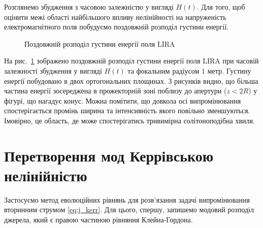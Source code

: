 
Розглянемо збудження з часовою залежністю у вигляді $ H(t) $. Для того, щоб 
оцінити межі області найбільшого впливу нелінійності на напруженість 
електромагнітного поля побудуємо поздовжній розподіл густини енергії. 

\begin{figure}
\caption{Поздовжній розподіл густини енергії поля LIRA}
\label{fig:long_dist}
\end{figure}

На рис.~\ref{fig:long_dist} зображено поздовжній розподіл густини енергії 
поля LIRA при часовій залежності збудження у вигляді $ H(t) $ та фокальним 
радіусом 1 метр. Густину енергії побудовано в двох ортогональних площинах.
З рисунків видно, що більша частина енергії зосереджена в прожекторній зоні 
поблизу до апертури ($ z < 2R $) у фігурі, що нагадує конус. Можна помітити, 
що довкола осі випромінювання спостерігається промінь ширина та інтенсивність 
якого повільно зменшуються. Імовірно, це область, де може спостерігатись 
тривимірна солітоноподібна хвиля.


\section{Перетворення мод Керрівською нелінійністю}

Застосуємо метод еволюційних рівнянь для розв'язання задачі випромінювання 
вторинним струмом \eqref{eq:j_kerr}. Для цього, спершу, запишемо модовий
розподіл джерела, який є правою частиною рівняння Клейна-Гордона. 

